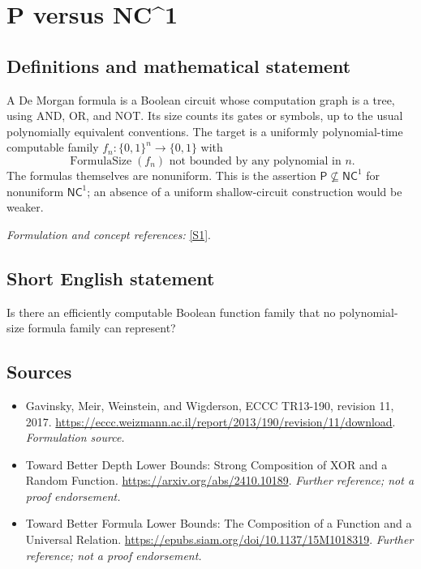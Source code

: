 \documentclass[11pt]{article}
\begin{document}
\section*{\texorpdfstring{P versus NC\textasciicircum{}1}{P versus NC\textasciicircum{}1}}\label{statement}
\subsection{Definitions and mathematical statement}
A De Morgan formula is a Boolean circuit whose computation graph is a tree, using AND, OR, and NOT. Its size counts its gates or symbols, up to the usual polynomially equivalent conventions. The target is a uniformly polynomial-time computable family $f_n:\{0,1\}^n\to\{0,1\}$ with
\[
 \operatorname{FormulaSize}(f_n)\text{ not bounded by any polynomial in }n.
\]
The formulas themselves are nonuniform. This is the assertion $\mathsf P\nsubseteq\mathsf{NC}^1$ for nonuniform $\mathsf{NC}^1$; an absence of a uniform shallow-circuit construction would be weaker.
\par\smallskip\textit{Formulation and concept references:} \href{https://eccc.weizmann.ac.il/report/2013/190/revision/11/download}{[S1]}.

\subsection{Short English statement}
Is there an efficiently computable Boolean function family that no polynomial-size formula family can represent?
\subsection{Sources}
\begin{itemize}
\item[S1]Gavinsky, Meir, Weinstein, and Wigderson, ECCC TR13-190, revision 11, 2017.
\url{https://eccc.weizmann.ac.il/report/2013/190/revision/11/download}.
\textit{Formulation source.}
\item[S2]Toward Better Depth Lower Bounds: Strong Composition of XOR and a Random Function.
\url{https://arxiv.org/abs/2410.10189}.
\textit{Further reference; not a proof endorsement.}
\item[S3]Toward Better Formula Lower Bounds: The Composition of a Function and a Universal Relation.
\url{https://epubs.siam.org/doi/10.1137/15M1018319}.
\textit{Further reference; not a proof endorsement.}
\end{itemize}
\end{document}
